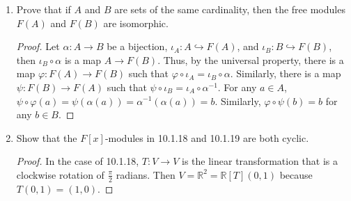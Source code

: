 \documentclass{report}
\newcommand{\R}{\mathbb{R}}
\begin{document}
\begin{enumerate} 
	\item Prove that if $A$ and $B$ are sets of the same cardinality, then the free modules $F(A)$ and $F(B)$ are isomorphic.
		\begin{proof}
			Let $\alpha:A\to B$ be a bijection, $\iota_A:A\hookrightarrow F(A)$, and $\iota_B:B \hookrightarrow F(B)$, then $\iota_B\circ\alpha$ is a map $A\to F(B)$.
			Thus, by the universal property, there is a map $\varphi:F(A)\to F(B)$ such that $\varphi\circ\iota_A=\iota_B\circ\alpha$.
			Similarly, there is a map $\psi:F(B)\to F(A)$ such that $\psi\circ\iota_B=\iota_A\circ\alpha^{-1}$.
			For any $a\in A$, $\psi\circ\varphi(a)=\psi(\alpha(a))=\alpha^{-1}(\alpha(a))=b$. Similarly, $\varphi\circ\psi(b)=b$ for any $b\in B$.
		\end{proof}
		
		\setcounter{enumi}{2}
		\newpage
	\item Show that the $F[x]$-modules in 10.1.18 and 10.1.19 are both cyclic.
		\begin{proof}
			In the case of 10.1.18, $T:V\to V$ is the linear transformation that is a clockwise rotation of $\frac{\pi}{2}$ radians.
			Then $V=\R^2=\R[T](0,1)$ because $T(0,1)=(1,0)$.
			\newline


\end{proof}
\end{enumerate}
\end{document}
